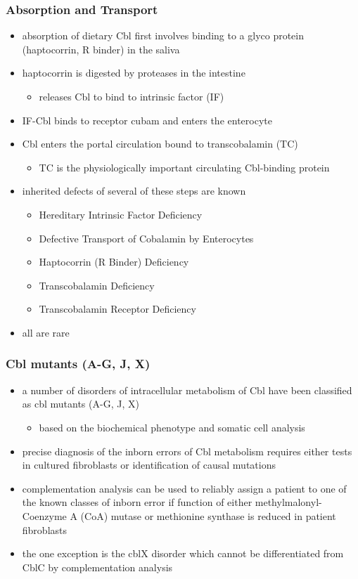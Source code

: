 \documentclass[12pt]{scrartcl}
\begin{document}
\subsubsection{Absorption and Transport}
\label{sec:org8546e5e}
\begin{itemize}
\item absorption of dietary Cbl first involves binding to a glyco protein
(haptocorrin, R binder) in the saliva
\item haptocorrin is digested by proteases in the intestine
\begin{itemize}
\item releases Cbl to bind to intrinsic factor (IF)
\end{itemize}
\item IF-Cbl binds to receptor cubam and enters the enterocyte
\item Cbl enters the portal circulation bound to transcobalamin (TC)
\begin{itemize}
\item TC is the physiologically important circulating Cbl-binding
protein
\end{itemize}
\item inherited defects of several of these steps are known
\begin{itemize}
\item Hereditary Intrinsic Factor Deficiency
\item Defective Transport of Cobalamin by Enterocytes
\item Haptocorrin (R Binder) Deficiency
\item Transcobalamin Deficiency
\item Transcobalamin Receptor Deficiency
\end{itemize}
\item all are rare
\end{itemize}
\subsubsection{Cbl mutants (A-G, J, X)}
\label{sec:orgc30ec83}
\begin{itemize}
\item a number of disorders of intracellular metabolism of Cbl have been
classified as cbl mutants (A-G, J, X)
\begin{itemize}
\item based on the biochemical phenotype and somatic cell analysis
\end{itemize}
\item precise diagnosis of the inborn errors of Cbl metabolism requires
either tests in cultured fibroblasts or identification of causal
mutations
\item complementation analysis can be used to reliably assign a patient to
one of the known classes of inborn error if function of either
methylmalonyl-Coenzyme A (CoA) mutase or methionine synthase is
reduced in patient fibroblasts
\item the one exception is the cblX disorder which cannot be
differentiated from CblC by complementation analysis
\end{itemize}
\end{document}
